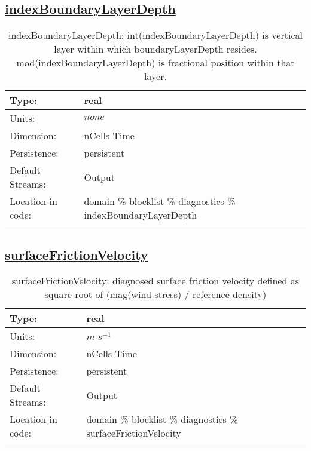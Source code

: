 \subsection[indexBoundaryLayerDepth]{\hyperref[sec:var_tab_diagnostics]{indexBoundaryLayerDepth}}
\label{subsec:var_sec_diagnostics_indexBoundaryLayerDepth}
\begin{center}
\begin{longtable}{| p{2.0in} | p{4.0in} |}
        \hline 
        Type: & real \\
        \hline 
        Units: & $none$ \\
        \hline 
        Dimension: & nCells Time \\
        \hline 
        Persistence: & persistent \\
        \hline 
		 Default Streams: & Output  \\
        \hline 
		 Location in code: & domain \% blocklist \% diagnostics \% indexBoundaryLayerDepth \\
		 \hline 
    \caption{indexBoundaryLayerDepth: int(indexBoundaryLayerDepth) is vertical layer within which boundaryLayerDepth resides. mod(indexBoundaryLayerDepth) is fractional position within that layer.}
\end{longtable}
\end{center}
\subsection[surfaceFrictionVelocity]{\hyperref[sec:var_tab_diagnostics]{surfaceFrictionVelocity}}
\label{subsec:var_sec_diagnostics_surfaceFrictionVelocity}
\begin{center}
\begin{longtable}{| p{2.0in} | p{4.0in} |}
        \hline 
        Type: & real \\
        \hline 
        Units: & $m$ $s^{-1}$ \\
        \hline 
        Dimension: & nCells Time \\
        \hline 
        Persistence: & persistent \\
        \hline 
		 Default Streams: & Output  \\
        \hline 
		 Location in code: & domain \% blocklist \% diagnostics \% surfaceFrictionVelocity \\
		 \hline 
    \caption{surfaceFrictionVelocity: diagnosed surface friction velocity defined as square root of (mag(wind stress) / reference density)}
\end{longtable}
\end{center}
